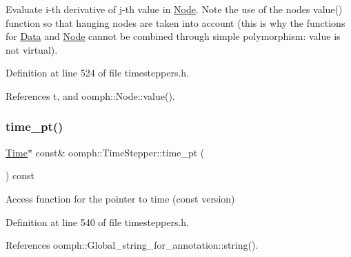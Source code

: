Evaluate i-\/th derivative of j-\/th value in \hyperlink{classoomph_1_1Node}{Node}. Note the use of the node\textquotesingle{}s value() function so that hanging nodes are taken into account (this is why the functions for \hyperlink{classoomph_1_1Data}{Data} and \hyperlink{classoomph_1_1Node}{Node} cannot be combined through simple polymorphism\+: value is not virtual). 



Definition at line 524 of file timesteppers.\+h.



References t, and oomph\+::\+Node\+::value().

\mbox{\label{classoomph_1_1TimeStepper_af85e8103c08de76d5a9399d30fc2211c}} 
\subsubsection{\texorpdfstring{time\+\_\+pt()}{time\_pt()}\hspace{0.1cm}{\footnotesize\ttfamily [1/2]}}
{\footnotesize\ttfamily \hyperlink{classoomph_1_1Time}{Time}$\ast$ const\& oomph\+::\+Time\+Stepper\+::time\+\_\+pt (\begin{DoxyParamCaption}{ }\end{DoxyParamCaption}) const\hspace{0.3cm}{\ttfamily [inline]}}



Access function for the pointer to time (const version) 



Definition at line 540 of file timesteppers.\+h.



References oomph\+::\+Global\+\_\+string\+\_\+for\+\_\+annotation\+::string().



